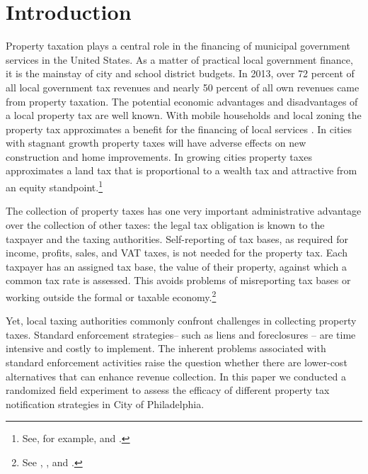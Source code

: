 \documentclass[12pt]{article}
\begin{document}
\newpage

\section{Introduction}

Property taxation plays a central role in the financing of municipal
government services in the United States. As a matter of practical
local government finance, it is the mainstay of city and school
district budgets.  In 2013, over 72 percent of all local government
tax revenues and nearly 50 percent of all own revenues came from
property taxation. The potential economic advantages and disadvantages
of a local property tax are well known.  With mobile households and
local zoning the property tax approximates a benefit for the financing
of local services \cite{Hamilton-75}.  In cities with stagnant growth
property taxes will have adverse effects on new construction and home
improvements.  In growing cities property taxes approximates a land
tax that is proportional to a wealth tax and attractive from an equity
standpoint.\footnote{See, for example,  and
  .}

The collection of property taxes has one very important administrative
advantage over the collection of other taxes: the legal tax obligation
is known to the taxpayer and the taxing authorities.  Self-reporting
of tax bases, as required for income, profits, sales, and VAT
taxes, is not needed for the property tax.  Each taxpayer has an
assigned tax base, the value of their property, against which a common tax
rate is assessed.  This avoids problems of misreporting tax bases or
working outside the formal or  taxable economy.\footnote{See
  , , and .}

Yet, local taxing authorities commonly confront challenges in
collecting property taxes.  Standard enforcement strategies-- such as
liens and foreclosures -- are time intensive and costly to implement.
The inherent problems associated with standard enforcement activities
raise the question whether there are lower-cost alternatives that can
enhance revenue collection.  In this paper we conducted a randomized
field experiment to assess the efficacy of different property tax
notification strategies in City of Philadelphia.
\end{document}
